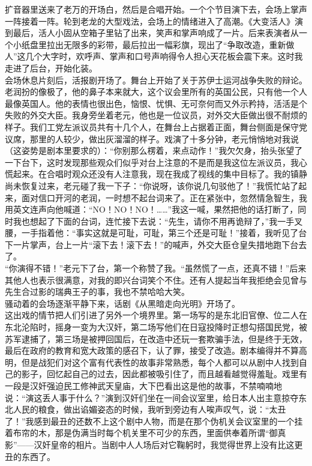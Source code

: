 扩音器里送来了老万的开场白，然后是合唱开始。一个个节目演下去，会场上掌声一阵接着一阵。轮到老龙的大型戏法，会场上的情绪进入了高潮。《大变活人》演到最后，活人小固从空箱子里钻了出来，笑声和掌声响成了一片。后来表演者从一个小纸盘里拉出无限多的彩带，最后拉出一幅彩旗，现出了“争取改造，重新做人”这几个大字时，欢呼声、掌声和口号声响得令人担心天花板会震下来。这时我走进了后台，开始化装。\\

会场休息片刻后，活报剧开场了。舞台上开始了关于苏伊士运河战争失败的辩论。老润扮的像极了，他的鼻子本来就大，这个议会里所有的英国公民，只有他一个人最像英国人。他的表情也很出色，恼恨、忧惧、无可奈何而又外示矜持，活活是个失败的外交大臣。我身旁坐着老元，他也是一位议员，对外交大臣做出很不耐烦的样子。我们工党左派议员共有十几个人，在舞台上占据着正面，舞台侧面是保守党议席，那里的人较少，做出灰溜溜的样子。戏演了十多分钟，老元悄悄地对我说（这姿势是剧本里要求的）：“你别那么楞着，来点动作！”我欠欠身，抬头张望了一下台下，这时发现那些观众们似乎对台上注意的不是而是我这位左派议员，我心慌起来。在合唱时观众还没有人注意我，现在我成了视线的集中目标了。我的镇静尚未恢复过来，老元碰了我一下子：“你说呀，该你说几句驳他了！”我慌忙站了起来，面对信口开河的老润，一时想不起台词来了。正在紧张中，忽然情急智生，我用英文连声向他喊道：“NO！NO！NO！……”我这一喊，果然把他的话打断了，同时我也想起了下面的台词，连忙接下去说：“先生，请你不用再诡辩了，”我一手叉腰，一手指着他：“事实这就是可耻，可耻，第三个还是可耻！”接着，我听见了台下一片掌声，台上一片“滚下去！滚下去！”的喊声，外交大臣仓皇失措地跑下台去了。\\

“你演得不错！”老元下了台，第一个称赞了我。“虽然慌了一点，还真不错！”后来其他人也表示很满意，对我的即兴台词笑个不住。还有人提起当年我拒绝会见曾与先生合过影的瑞典王子的事，我也不禁哈哈大笑。\\

骚动着的会场逐渐平静下来，话剧《从黑暗走向光明》开场了。\\

这出戏的情节把人们引进了另外一个境界里。第一场写的是东北旧官僚、位二人在东北沦陷时，摇身一变为大汉奸，第二场写他们在日寇投降时正想勾搭国民党，被苏军逮捕了，第三场是被押回国后，在改造中还玩一套欺骗手法，但是终于无效，最后在政府的教育和宽大政策的感召下，认了罪，接受了改造。剧本编得并不算高明，但是战犯们对这个富有代表性的故事非常熟悉，每个人都可以从剧中人找到自己的影子，回忆起自己的过去，因此都被吸引住了，而且越看越觉得羞耻。戏里有一段是汉奸强迫民工修神武天皇庙，大下巴看出这是他的故事，不禁喃喃地说：“演这丢人事于什么？”演到汉奸们坐在一间会议室里，给日本人出主意掠夺东北人民的粮食，做出谄媚姿态的时候，我听到旁边有人唉声叹气，说：“太丑了！”我感到最丑的还数不上这个剧中人物，而是在那个伪机关会议室里的一个挂着布帘的木，那是伪满当时每个机关里不可少的东西，里面供奉着所谓“御真影”——汉奸皇帝的相片。当剧中人人场后对它鞠躬时，我觉得世界上没有比这更丑的东西了。\\

